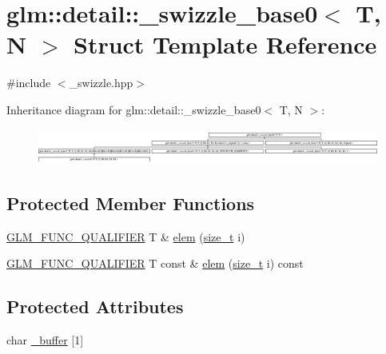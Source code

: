 \hypertarget{structglm_1_1detail_1_1__swizzle__base0}{}\section{glm\+:\+:detail\+:\+:\+\_\+swizzle\+\_\+base0$<$ T, N $>$ Struct Template Reference}
\label{structglm_1_1detail_1_1__swizzle__base0}


{\ttfamily \#include $<$\+\_\+swizzle.\+hpp$>$}

Inheritance diagram for glm\+:\+:detail\+:\+:\+\_\+swizzle\+\_\+base0$<$ T, N $>$\+:\begin{figure}[H]
\begin{center}
\leavevmode
\includegraphics[height=1.177708cm]{structglm_1_1detail_1_1__swizzle__base0}
\end{center}
\end{figure}
\subsection*{Protected Member Functions}
\begin{DoxyCompactItemize}
\item 
\mbox{\hyperlink{setup_8hpp_a33fdea6f91c5f834105f7415e2a64407}{G\+L\+M\+\_\+\+F\+U\+N\+C\+\_\+\+Q\+U\+A\+L\+I\+F\+I\+ER}} T \& \mbox{\hyperlink{structglm_1_1detail_1_1__swizzle__base0_a4011ff1a445ccda72c385462106eb3ff}{elem}} (\mbox{\hyperlink{_s_d_l__config__winrt_8h_a7c94ea6f8948649f8d181ae55911eeaf}{size\+\_\+t}} i)
\item 
\mbox{\hyperlink{setup_8hpp_a33fdea6f91c5f834105f7415e2a64407}{G\+L\+M\+\_\+\+F\+U\+N\+C\+\_\+\+Q\+U\+A\+L\+I\+F\+I\+ER}} T const  \& \mbox{\hyperlink{structglm_1_1detail_1_1__swizzle__base0_a495081f60b8fc565a5a35bfdd8b13c84}{elem}} (\mbox{\hyperlink{_s_d_l__config__winrt_8h_a7c94ea6f8948649f8d181ae55911eeaf}{size\+\_\+t}} i) const
\end{DoxyCompactItemize}
\subsection*{Protected Attributes}
\begin{DoxyCompactItemize}
\item 
char \mbox{\hyperlink{structglm_1_1detail_1_1__swizzle__base0_afd4b7f15c9acff4cdef808f559ffec2d}{\+\_\+buffer}} \mbox{[}1\mbox{]}
\end{DoxyCompactItemize}


